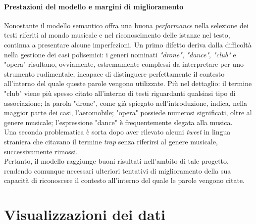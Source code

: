 \documentclass[12pt, a4paper, twocolumn]{article} %
\begin{document}
\subsection{Prestazioni del modello e margini di miglioramento}
Nonostante il modello semantico offra una buona \textit{performance} nella selezione dei testi riferiti al mondo musicale e nel riconoscimento delle istanze nel testo, continua a presentare alcune imperfezioni. Un primo difetto deriva dalla difficoltà nella gestione dei casi polisemici: i generi nominati \textit{"drone"}, \textit{"dance"}, \textit{"club"} e "opera" risultano, ovviamente, estremamente complessi da interpretare per uno strumento rudimentale, incapace di distinguere perfettamente il contesto all'interno del quale queste parole vengono utilizzate. Più nel dettaglio: il termine "club" viene più spesso citato all'interno di testi riguardanti qualsiasi tipo di associazione; la parola "drone", come già spiegato nell'introduzione, indica, nella maggior parte dei casi, l'aeromobile; "opera" possiede numerosi significati, oltre al genere musicale; l'espressione "dance" è frequentemente slegata alla musica. \\
Una seconda problematica è sorta dopo aver rilevato alcuni \textit{tweet} in lingua straniera che citavano il termine \textit{trap} senza riferirsi al genere musicale, successivamente rimossi.\\
Pertanto, il modello raggiunge buoni risultati nell'ambito di tale progetto, rendendo comunque necessari ulteriori tentativi di miglioramento della sua capacità di riconoscere il contesto all'interno del quale le parole vengono citate.

\hfill
\newpage
\part{Visualizzazioni dei dati}
\end{document}
